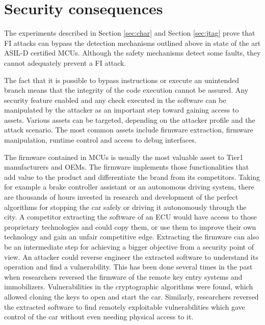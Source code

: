 \documentclass[10pt, conference, compsocconf]{IEEEtran}
\begin{document}
\section{Security consequences}
The experiments described in Section \ref{sec:char} and Section \ref{sec:jtag} prove that FI attacks can bypass the detection mechanisms outlined above in state of the art ASIL-D certified MCUs. Although the safety mechanisms detect some faults, they cannot adequately prevent a FI attack.

The fact that it is possible to bypass instructions or execute an unintended branch means that the integrity of the code execution cannot be assured. Any security feature enabled and any check executed in the software can be manipulated by the attacker as an important step toward gaining access to assets. Various assets can be targeted, depending on the attacker profile and the attack scenario. The most common assets include firmware extraction, firmware manipulation, runtime control and access to debug interfaces.

The firmware contained in MCUs is usually the most valuable asset to Tier1 manufacturers and OEMs. The firmware implements those functionalities that add value to the product and differentiate the brand from its competitors. Taking for example a brake controller assistant or an autonomous driving system, there are thousands of hours invested in research and development of the perfect algorithms for stopping the car safely or driving it autonomously through the city. A competitor extracting the software of an ECU would have access to those proprietary technologies and could copy them, or use them to improve their own technology and gain an unfair competitive edge. Extracting the firmware can also be an intermediate step for achieving a bigger objective from a security point of view. An attacker could reverse engineer the extracted software to understand its operation and find a vulnerability. This has been done several times in the past when researchers \cite{garcia_lock_2016,kasper_breaking_2009,verdult_dismantling_2015} reversed the firmware of the remote key entry systems and immobilizers. Vulnerabilities in the cryptographic algorithms were found, which allowed cloning the keys to open and start the car. Similarly, researchers \cite{miller_remote_2015} reversed the extracted software to find remotely exploitable vulnerabilities which gave control of the car without even needing physical access to it.
\end{document}
